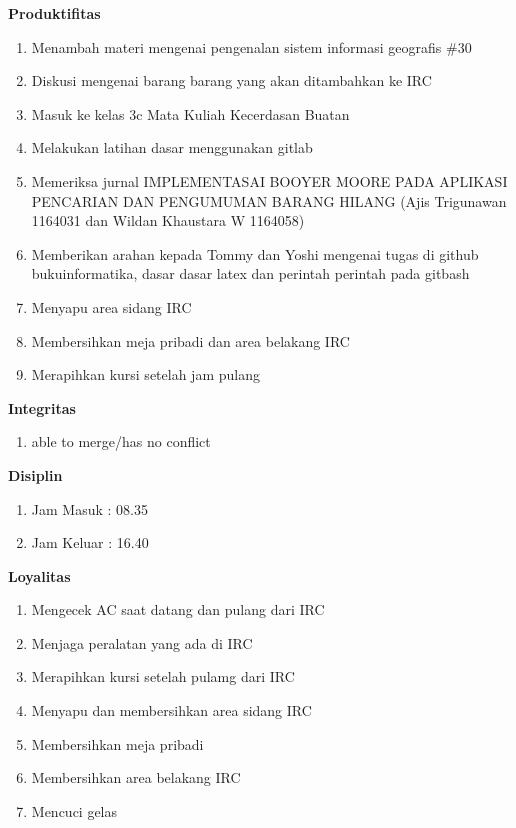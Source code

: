 \begin{enumerate}
\textbf{Produktifitas}
\begin{enumerate}
\item Menambah materi mengenai pengenalan sistem informasi geografis \#30
\item Diskusi mengenai barang barang yang akan ditambahkan ke IRC
\item Masuk ke kelas 3c Mata Kuliah Kecerdasan Buatan 
\item Melakukan latihan dasar menggunakan gitlab
\item Memeriksa jurnal IMPLEMENTASAI BOOYER MOORE PADA APLIKASI PENCARIAN DAN PENGUMUMAN BARANG HILANG (Ajis Trigunawan 1164031 dan Wildan Khaustara W 1164058)
\item Memberikan arahan kepada Tommy dan Yoshi mengenai tugas di github bukuinformatika, dasar dasar latex dan perintah perintah pada gitbash 
\item Menyapu area sidang IRC
\item Membersihkan meja pribadi dan area belakang IRC
\item Merapihkan kursi setelah jam pulang 
\end{enumerate}

\textbf{Integritas}
\begin{enumerate}
\item able to merge/has no conflict
\end{enumerate}

\textbf{Disiplin}
\begin{enumerate}
\item Jam Masuk : 08.35
\item Jam Keluar : 16.40
\end{enumerate}

\textbf{Loyalitas}
\begin{enumerate}
\item Mengecek AC saat datang dan pulang dari IRC
\item Menjaga peralatan yang ada di IRC
\item Merapihkan kursi setelah pulamg dari IRC
\item Menyapu dan membersihkan area sidang IRC
\item Membersihkan meja pribadi
\item Membersihkan area belakang IRC
\item Mencuci gelas
\end{enumerate}


\end{enumerate}
